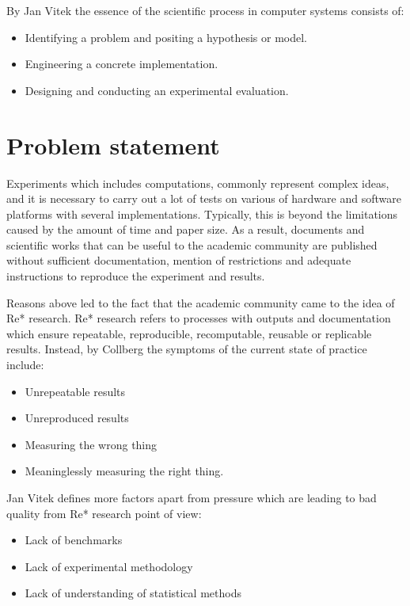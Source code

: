 \par By Jan Vitek\cite{DBLP:conf/emsoft/VitekK11} the essence of the scientific process in computer systems consists of:
\begin{itemize}
    \item Identifying a problem and positing a hypothesis or model.
    \item Engineering a concrete implementation.
    \item Designing and conducting an experimental evaluation.
\end{itemize} \par

\section{Problem statement}
Experiments which includes computations, commonly represent complex ideas, and it is necessary to carry out a lot of tests on various of hardware and software platforms with several implementations. Typically, this is beyond the limitations caused by the amount of time and paper size. As a result, documents and scientific works that can be useful to the academic community are published without sufficient documentation, mention of restrictions and adequate instructions to reproduce the experiment and results. \par
Reasons above led to the fact that the academic community came to the idea of Re* research. Re* research refers to processes with outputs and documentation which ensure repeatable, reproducible, recomputable, reusable or replicable results. Instead, by Collberg\cite{DBLP:journals/cacm/CollbergP16} the symptoms of the current state of practice include:
\begin{itemize}
    \item Unrepeatable results
    \item Unreproduced results 
    \item Measuring the wrong thing 
    \item Meaninglessly measuring the right thing. 
\end{itemize} \par
Jan Vitek\cite{DBLP:conf/emsoft/VitekK11} defines more factors apart from pressure which are leading to bad quality from Re* research point of view:
\begin{itemize}
    \item Lack of benchmarks
    \item Lack of experimental methodology
    \item Lack of understanding of statistical methods
\end{itemize}
